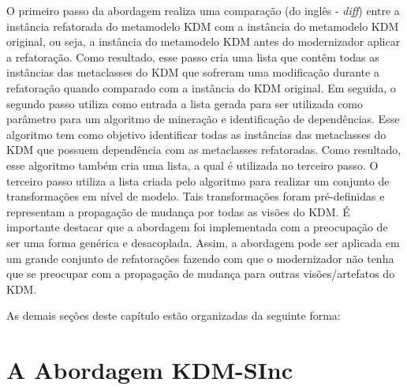 O primeiro passo da abordagem realiza uma comparação (do inglês - \textit{diff}) entre a instância refatorada do metamodelo KDM com a instância do metamodelo KDM original, ou seja, a instância do metamodelo KDM antes do modernizador aplicar a refatoração. Como resultado, esse passo cria uma lista que contêm todas as instâncias das metaclasses do KDM que sofreram uma modificação durante a refatoração quando comparado com a instância do KDM original. Em seguida, o segundo passo utiliza como entrada a lista gerada para ser utilizada como parâmetro para um algoritmo de mineração e identificação de dependências. Esse algoritmo tem como objetivo identificar todas as instâncias das metaclasses do KDM que possuem dependência com as metaclasses refatoradas. Como resultado, esse algoritmo também cria uma lista, a qual é utilizada no terceiro passo. O terceiro passo utiliza a lista criada pelo algoritmo para realizar um conjunto de transformações em nível de modelo. Tais transformações foram pré-definidas e representam a propagação de mudança por todas as visões do KDM. É importante destacar que a abordagem foi implementada com a preocupação de ser uma forma genérica e desacoplada. Assim, a abordagem pode ser aplicada em um grande conjunto de refatorações fazendo com que o modernizador não tenha que se preocupar com a propagação de mudança para outras visões/artefatos do KDM. 

As demais seções deste capítulo estão organizadas da seguinte forma:


\section{A Abordagem KDM-SInc}\label{sec:kdm_sinc}

